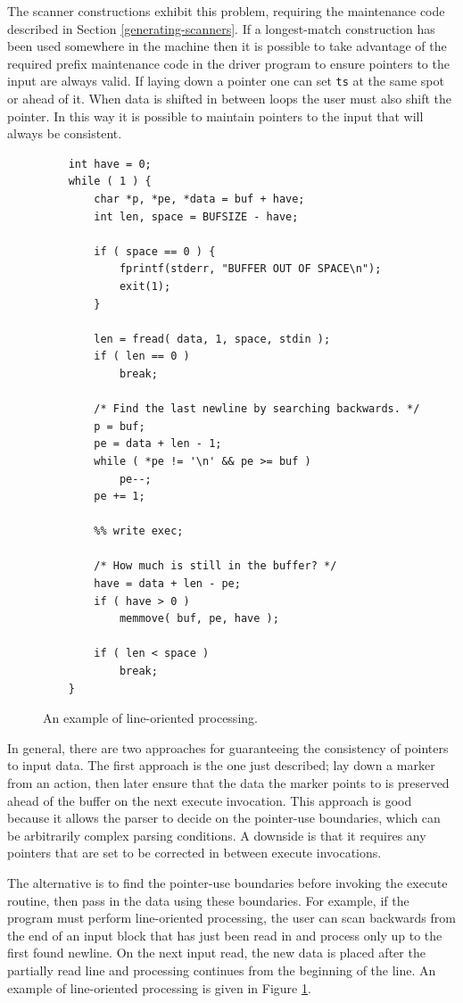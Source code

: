 \documentclass[letterpaper,11pt,oneside]{book}
\begin{document}
The scanner constructions exhibit this problem, requiring the maintenance
code described in Section \ref{generating-scanners}. If a longest-match
construction has been used somewhere in the machine then it is possible to
take advantage of the required prefix maintenance code in the driver program to
ensure pointers to the input are always valid. If laying down a pointer one can
set \verb|ts| at the same spot or ahead of it. When data is shifted in
between loops the user must also shift the pointer.  In this way it is possible
to maintain pointers to the input that will always be consistent.

\begin{figure}
\small
\begin{verbatim}
    int have = 0;
    while ( 1 ) {
        char *p, *pe, *data = buf + have;
        int len, space = BUFSIZE - have;

        if ( space == 0 ) { 
            fprintf(stderr, "BUFFER OUT OF SPACE\n");
            exit(1);
        }

        len = fread( data, 1, space, stdin );
        if ( len == 0 )
            break;

        /* Find the last newline by searching backwards. */
        p = buf;
        pe = data + len - 1;
        while ( *pe != '\n' && pe >= buf )
            pe--;
        pe += 1;

        %% write exec;

        /* How much is still in the buffer? */
        have = data + len - pe;
        if ( have > 0 )
            memmove( buf, pe, have );

        if ( len < space )
            break;
    }
\end{verbatim}
\caption{An example of line-oriented processing.}
\label{line-oriented}
\end{figure}

In general, there are two approaches for guaranteeing the consistency of
pointers to input data. The first approach is the one just described;
lay down a marker from an action,
then later ensure that the data the marker points to is preserved ahead of
the buffer on the next execute invocation. This approach is good because it
allows the parser to decide on the pointer-use boundaries, which can be
arbitrarily complex parsing conditions. A downside is that it requires any
pointers that are set to be corrected in between execute invocations.

The alternative is to find the pointer-use boundaries before invoking the execute
routine, then pass in the data using these boundaries. For example, if the
program must perform line-oriented processing, the user can scan backwards from
the end of an input block that has just been read in and process only up to the
first found newline. On the next input read, the new data is placed after the
partially read line and processing continues from the beginning of the line.
An example of line-oriented processing is given in Figure \ref{line-oriented}.
\end{document}
